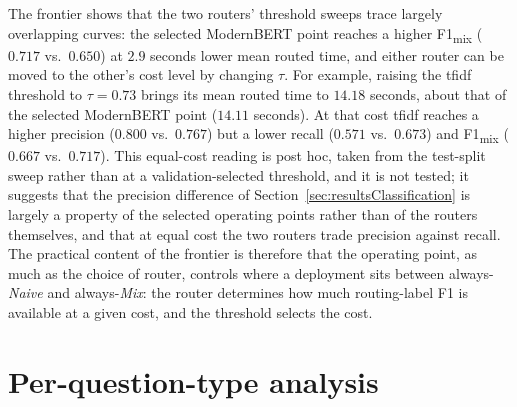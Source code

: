\documentclass[english, bibtex]{kththesis}               %
\numberwithin{listing}{chapter}
\providecommand{\DIFaddtex}[1]{{\protect\color{blue} \sf #1}} %
\providecommand{\DIFaddbegin}{} %
\providecommand{\DIFaddend}{} %
\providecommand{\DIFadd}[1]{\texorpdfstring{\DIFaddtex{#1}}{#1}} %
\begin{document}
The frontier shows that the two routers' threshold sweeps trace largely overlapping curves: the selected ModernBERT point reaches a higher F1\textsubscript{mix} ($0.717$ vs.\ $0.650$) at $2.9$ seconds lower mean routed time, and either router can be moved to the other's cost level by changing $\tau$. \DIFaddbegin \DIFadd{For example, raising the \gls{tfidf} threshold to $\tau = 0.73$ brings its mean routed time to $14.18$ seconds, about that of the selected ModernBERT point ($14.11$ seconds). At that cost \gls{tfidf} reaches a higher precision ($0.800$ vs.\ $0.767$) but a lower recall ($0.571$ vs.\ $0.673$) and F1\textsubscript{mix} ($0.667$ vs.\ $0.717$). This equal-cost reading is post hoc, taken from the test-split sweep rather than at a validation-selected threshold, and it is not tested; it suggests that the precision difference of Section~\ref{sec:resultsClassification} is largely a property of the selected operating points rather than of the routers themselves, and that at equal cost the two routers trade precision against recall. }\DIFaddend The practical content of the frontier is therefore that the operating point, as much as the choice of router, controls where a deployment sits between always-\emph{Naive} and always-\emph{Mix}: the router determines how much routing-label F1 is available at a given cost, and the threshold selects the cost.

\section{Per-question-type analysis}
\label{sec:resultsPerType}
\end{document}
